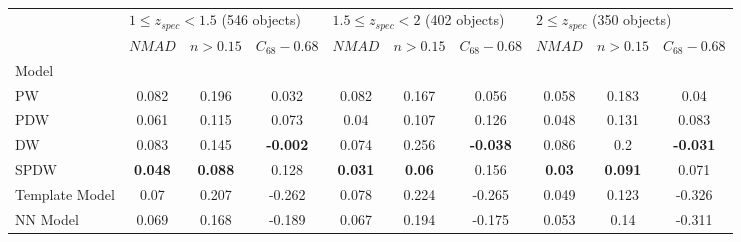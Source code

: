 \documentclass[fleqn,usenatbib]{mnras}
\begin{document}
\begin{table}
	\begin{tabular}{lccccccccc}
            \hline
            {} & \multicolumn{3}{l}{$1 \leq z_{spec} < 1.5$ (546 objects)} & \multicolumn{3}{l}{$1.5 \leq z_{spec} < 2$ (402 objects)} & \multicolumn{3}{l}{$2 \leq z_{spec}$ (350 objects)} \\
            {} &                                $NMAD$ &        $n>0.15$ &  $C_{68} - 0.68$ &                                $NMAD$ &       $n>0.15$ &  $C_{68} - 0.68$ &                          $NMAD$ &        $n>0.15$ &  $C_{68} - 0.68$ \\
            Model          &                                       &                 &                  &                                       &                &                  &                                 &                 &                  \\
            \hline
            PW             &                                 0.082 &           0.196 &            0.032 &                                 0.082 &          0.167 &            0.056 &                           0.058 &           0.183 &             0.04 \\
            PDW            &                                 0.061 &           0.115 &            0.073 &                                  0.04 &          0.107 &            0.126 &                           0.048 &           0.131 &            0.083 \\
            DW             &                                 0.083 &           0.145 &  \textbf{-0.002} &                                 0.074 &          0.256 &  \textbf{-0.038} &                           0.086 &             0.2 &  \textbf{-0.031} \\
            SPDW           &                        \textbf{0.048} &  \textbf{0.088} &            0.128 &                        \textbf{0.031} &  \textbf{0.06} &            0.156 &                   \textbf{0.03} &  \textbf{0.091} &            0.071 \\
            Template Model &                                  0.07 &           0.207 &           -0.262 &                                 0.078 &          0.224 &           -0.265 &                           0.049 &           0.123 &           -0.326 \\
            NN Model       &                                 0.069 &           0.168 &           -0.189 &                                 0.067 &          0.194 &           -0.175 &                           0.053 &            0.14 &           -0.311 \\
            \hline
            \end{tabular}
            \caption{}
\end{table}
\end{document}
